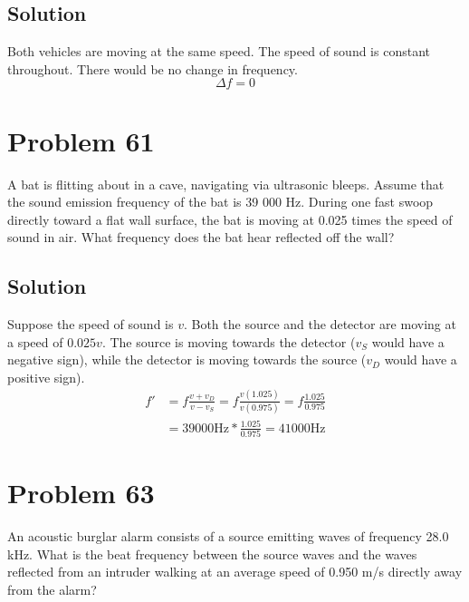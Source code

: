 \documentclass[12pt]{article}
\begin{document}
        \subsection{Solution}
            Both vehicles are moving at the same speed.
            The speed of sound is constant throughout.
            There would be no change in frequency.
            \begin{equation}
                \boxed{\Delta f = 0}
            \end{equation}

    \section{Problem 61}
        A bat is flitting about in a cave, navigating via ultrasonic bleeps. 
        Assume that the sound emission frequency of the bat is 39 000 Hz. 
        During one fast swoop directly toward a flat wall surface, the bat is moving at 0.025 times the speed of sound in air. 
        What frequency does the bat hear reflected off the wall?

        \subsection{Solution}
            Suppose the speed of sound is $v$.
            Both the source and the detector are moving at a speed of $0.025v$.
            The source is moving towards the detector ($v_S$ would have a negative sign), while the detector is moving towards the source ($v_D$ would have a positive sign).
            \begin{align}
                f'  &=  f\frac{v + v_D}{v - v_S}
                    =   f \frac{v(1.025)}{v(0.975)}
                    =   f \frac{1.025}{0.975}\\
                    &=  39000\unit{\hertz} * \frac{1.025}{0.975}
                    =   \boxed{41000\unit{\hertz}}
            \end{align}

    \pagebreak
    \section{Problem 63}
        An acoustic burglar alarm consists of a source emitting waves of frequency 28.0 kHz. 
        What is the beat frequency between the source waves and the waves reflected from an intruder walking at an average speed of 0.950 m/s directly away from the alarm?
\end{document}
